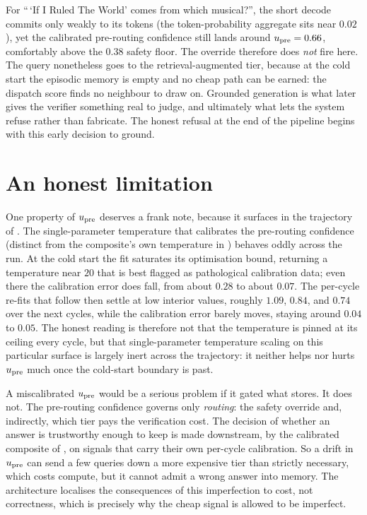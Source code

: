 \begin{scenario}
For ``\,`If I Ruled The World' comes from which musical?'', the short decode commits
only weakly to its tokens (the token-probability aggregate sits near $0.02$), yet the
calibrated pre-routing confidence still lands around $u_{\text{pre}} = 0.66$, comfortably above
the $0.38$ safety floor. The override therefore does \emph{not} fire here. The query
nonetheless goes to the retrieval-augmented tier, because at the cold start the
episodic memory is empty and no cheap path can be earned: the dispatch score finds no
neighbour to draw on. Grounded generation is what later gives the verifier something
real to judge, and ultimately what lets the system refuse rather than fabricate. The
honest refusal at the end of the pipeline begins with this early decision to ground.
\end{scenario}

\section{An honest limitation}
\label{sec:upre-threats}

One property of $u_{\text{pre}}$ deserves a frank note, because it surfaces in the
trajectory of . The single-parameter temperature that calibrates
the pre-routing confidence (distinct from the composite's own temperature in
) behaves oddly across the run. At the cold start the fit saturates
its optimisation bound, returning a temperature near $20$ that is best flagged as
pathological calibration data; even there the calibration error does fall, from about
$0.28$ to about $0.07$. The per-cycle re-fits that follow then settle at low interior
values, roughly $1.09$, $0.84$, and $0.74$ over the next cycles, while the calibration
error barely moves, staying around $0.04$ to $0.05$. The honest reading is therefore
not that the temperature is pinned at its ceiling every cycle, but that
single-parameter temperature scaling on this particular surface is largely inert
across the trajectory: it neither helps nor hurts $u_{\text{pre}}$ much once the cold-start
boundary is past.

\begin{pitfall}
A miscalibrated $u_{\text{pre}}$ would be a serious problem if it gated what \caem{}
stores. It does not. The pre-routing confidence governs only \emph{routing}: the
safety override and, indirectly, which tier pays the verification cost. The
decision of whether an answer is trustworthy enough to keep is made downstream, by
the calibrated composite of , on signals that carry their own
per-cycle calibration. So a drift in $u_{\text{pre}}$ can send a few queries down a more
expensive tier than strictly necessary, which costs compute, but it cannot admit a
wrong answer into memory. The architecture localises the consequences of this
imperfection to cost, not correctness, which is precisely why the cheap signal is
allowed to be imperfect.
\end{pitfall}

